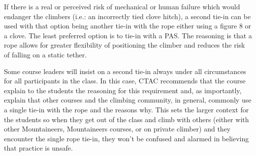\documentclass[nonacm,acmtog,authordraft]{acmart}
\begin{document}
If there is a real or perceived risk of mechanical or human failure which would
endanger the climbers (i.e.: an incorrectly tied clove hitch), a second tie-in
can be used with that option being another tie-in with the rope either using a
figure 8 or a clove. The least preferred option is to tie-in with a PAS.  The
reasoning is that a rope allows for greater flexibility of positioning the
climber and reduces the risk of falling on a static tether.

Some course leaders will insist on a second tie-in always under all
circumstances for all participants in the class.  In this case, CTAC recommends
that the course explain to the students the reasoning for this requirement and,
as importantly, explain that other courses and the climbing community, in
general, commonly use a single tie-in with the rope and the reasons why. This
sets the larger context for the students so when they get out of the class and
climb with others (either with other Mountaineers, Mountaineers courses, or on
private climber) and they encounter the single rope tie-in, they won't be
confused and alarmed in believing that practice is unsafe.



\end{document}
